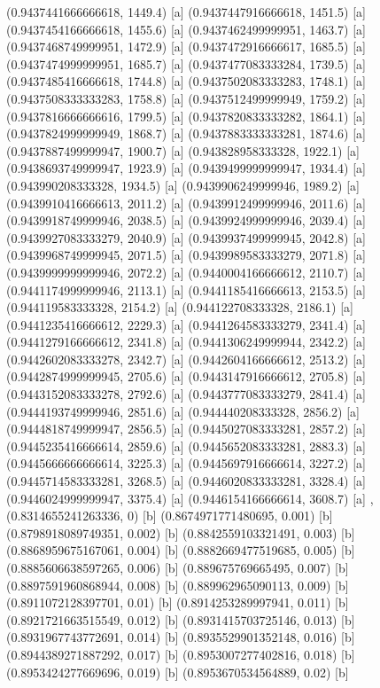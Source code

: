 {{{(0.9437441666666618, 1449.4) [a] 
(0.9437447916666618, 1451.5) [a] 
(0.9437454166666618, 1455.6) [a] 
(0.9437462499999951, 1463.7) [a] 
(0.9437468749999951, 1472.9) [a] 
(0.9437472916666617, 1685.5) [a] 
(0.9437474999999951, 1685.7) [a] 
(0.9437477083333284, 1739.5) [a] 
(0.9437485416666618, 1744.8) [a] 
(0.9437502083333283, 1748.1) [a] 
(0.9437508333333283, 1758.8) [a] 
(0.9437512499999949, 1759.2) [a] 
(0.9437816666666616, 1799.5) [a] 
(0.9437820833333282, 1864.1) [a] 
(0.9437824999999949, 1868.7) [a] 
(0.9437883333333281, 1874.6) [a] 
(0.9437887499999947, 1900.7) [a] 
(0.943828958333328, 1922.1) [a] 
(0.9438693749999947, 1923.9) [a] 
(0.9439499999999947, 1934.4) [a] 
(0.943990208333328, 1934.5) [a] 
(0.9439906249999946, 1989.2) [a] 
(0.9439910416666613, 2011.2) [a] 
(0.9439912499999946, 2011.6) [a] 
(0.9439918749999946, 2038.5) [a] 
(0.9439924999999946, 2039.4) [a] 
(0.9439927083333279, 2040.9) [a] 
(0.9439937499999945, 2042.8) [a] 
(0.9439968749999945, 2071.5) [a] 
(0.9439989583333279, 2071.8) [a] 
(0.9439999999999946, 2072.2) [a] 
(0.9440004166666612, 2110.7) [a] 
(0.9441174999999946, 2113.1) [a] 
(0.9441185416666613, 2153.5) [a] 
(0.944119583333328, 2154.2) [a] 
(0.944122708333328, 2186.1) [a] 
(0.9441235416666612, 2229.3) [a] 
(0.9441264583333279, 2341.4) [a] 
(0.9441279166666612, 2341.8) [a] 
(0.9441306249999944, 2342.2) [a] 
(0.9442602083333278, 2342.7) [a] 
(0.9442604166666612, 2513.2) [a] 
(0.9442874999999945, 2705.6) [a] 
(0.9443147916666612, 2705.8) [a] 
(0.9443152083333278, 2792.6) [a] 
(0.9443777083333279, 2841.4) [a] 
(0.9444193749999946, 2851.6) [a] 
(0.944440208333328, 2856.2) [a] 
(0.9444818749999947, 2856.5) [a] 
(0.9445027083333281, 2857.2) [a] 
(0.9445235416666614, 2859.6) [a] 
(0.9445652083333281, 2883.3) [a] 
(0.9445666666666614, 3225.3) [a] 
(0.9445697916666614, 3227.2) [a] 
(0.9445714583333281, 3268.5) [a] 
(0.9446020833333281, 3328.4) [a] 
(0.9446024999999947, 3375.4) [a] 
(0.9446154166666614, 3608.7) [a] 
},{(0.8314655241263336, 0) [b] 
(0.8674971771480695, 0.001) [b] 
(0.8798918089749351, 0.002) [b] 
(0.8842559103321491, 0.003) [b] 
(0.8868959675167061, 0.004) [b] 
(0.8882669477519685, 0.005) [b] 
(0.8885606638597265, 0.006) [b] 
(0.889675769665495, 0.007) [b] 
(0.8897591960868944, 0.008) [b] 
(0.889962965090113, 0.009) [b] 
(0.8911072128397701, 0.01) [b] 
(0.8914253289997941, 0.011) [b] 
(0.8921721663515549, 0.012) [b] 
(0.8931415703725146, 0.013) [b] 
(0.8931967743772691, 0.014) [b] 
(0.8935529901352148, 0.016) [b] 
(0.8944389271887292, 0.017) [b] 
(0.8953007277402816, 0.018) [b] 
(0.8953424277669696, 0.019) [b] 
(0.8953670534564889, 0.02) [b] 
}}}
